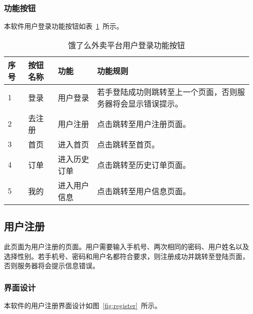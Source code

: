 \subsubsection{功能按钮}
本软件用户登录功能按钮如表~\ref{tab:table7}~所示。
\begin{table}[htbp]
    \caption{饿了么外卖平台用户登录功能按钮}\label{tab:table7}
    \vspace{0.5em}\wuhao
    \begin{tabularx}{\textwidth}{lllX}
    \toprule[1.5pt]
    序号 & 按钮名称 & 功能 & 功能规则 \\ 
    \midrule[1pt]
    1 & 登录 & 用户登录 & 若手登陆成功则跳转至上一个页面，否则服务器将会显示错误提示。 \\
    2 & 去注册 & 用户注册 & 点击跳转至用户注册页面。 \\
    3 & 首页 & 进入首页 & 点击跳转至首页。 \\
    4 & 订单 & 进入历史订单 & 点击跳转至历史订单页面。 \\
    5 & 我的 & 进入用户信息 & 点击跳转至用户信息页面。 \\
\bottomrule[1.5pt]
\end{tabularx}
\vspace{\baselineskip}
\end{table}

\subsection{用户注册}
此页面为用户注册的页面。用户需要输入手机号、两次相同的密码、用户姓名以及选择性别。若手机号、密码和用户名都符合要求，则注册成功并跳转至登陆页面，否则服务器将会提示信息错误。
\subsubsection{界面设计}
本软件的用户注册界面设计如图~\ref{fig:register}~所示。
